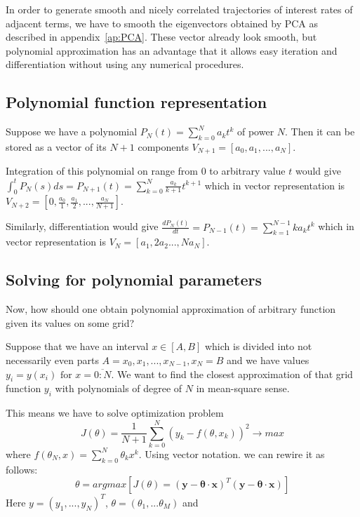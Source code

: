 \documentclass[11pt]{article} %
\begin{document}
In order to generate smooth and nicely correlated trajectories of interest rates of adjacent terms, we have to smooth the eigenvectors obtained by PCA as described in appendix~\ref{ap:PCA}. These vector already look smooth, but polynomial approximation has an advantage that it allows easy iteration and differentiation without using any numerical procedures. 
\subsection{Polynomial function representation}
Suppose we have a polynomial $P_N(t) = \sum_{k=0}^N a_k t^k$ of power $N$. Then it can be stored as a vector of its $N+1$ components $V_{N+1} = [a_0, a_1, ..., a_N]$.

Integration of this polynomial on range from $0$ to arbitrary value $t$ would give $\int_0^t{P_N(s)ds} = P_{N+1}(t) = \sum_{k=0}^{N} \frac{a_k}{k+1} t^{k+1}$
which in vector representation is $V_{N+2} = \left[0, \frac{a_0}{1}, \frac{a_1}{2}, ..., \frac{a_N}{N+1}\right]$. 

Similarly, differentiation would give $\frac{dP_N(t)}{dt} = P_{N-1}(t) = \sum_{k=1}^{N-1} ka_k t^k$ which in vector representation is $V_{N} = \left[a_1, 2a_2 ..., Na_N\right]$.

\subsection{Solving for polynomial parameters}
Now, how should one obtain polynomial approximation of arbitrary function given its values on some grid? 

Suppose that we have an interval $x \in [A,B]$ which is divided into not necessarily even parts $A = x_0, x_1, ..., x_{N-1}, x_N = B$ and we have values $y_i = y(x_i) \text{ for } x = \overline{0:N}$. We want to find the closest approximation of that grid function $y_i$ with polynomials of degree of $N$ in mean-square sense. 

This means we have to solve optimization problem 
\begin{equation}
J(\theta) = \frac{1}{N+1}\sum_{k=0}^{N}\left(y_k-f(\theta,x_k)\right)^2 \to max
\end{equation} where $f(\theta_N,x) =  \sum_{k=0}^N \theta_k x^k$.
Using vector notation. we can rewire it as follows:
\begin{equation}
\theta = argmax\left[J(\theta) = \left(\mathbf{y}-\mathbf{\theta \cdot x}\right)^T\left(\mathbf{y}-\mathbf{\theta \cdot x}\right)\right]
\end{equation} 
Here $y = (y_1, ..., y_N)^T$, $\theta = (\theta_1,...\theta_M)$ and 
\end{document}
